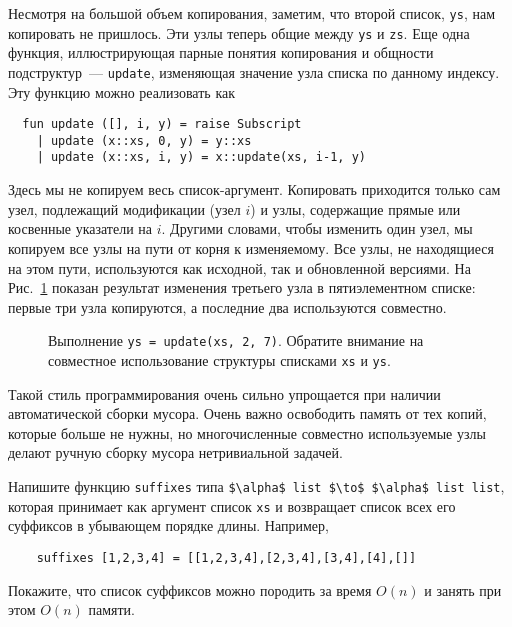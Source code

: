 Несмотря на большой объем копирования, заметим, что второй список, \lstinline!ys!, нам
копировать не пришлось. Эти узлы теперь общие между
\lstinline!ys! и \lstinline!zs!. Еще одна функция, иллюстрирующая
парные понятия копирования и общности подструктур~---
\lstinline!update!, изменяющая значение узла списка по данному
индексу. Эту функцию можно реализовать как
\begin{lstlisting}
  fun update ([], i, y) = raise Subscript
    | update (x::xs, 0, y) = y::xs
    | update (x::xs, i, y) = x::update(xs, i-1, y)
\end{lstlisting}
Здесь мы не копируем весь список-аргумент. Копировать приходится
только сам узел, подлежащий модификации (узел $i$) и узлы,
содержащие прямые или косвенные указатели на $i$.  Другими словами,
чтобы изменить один узел, мы копируем все узлы на пути от корня
к изменяемому. Все узлы, не находящиеся на этом пути, используются как
исходной, так и обновленной версиями. На Рис.~\ref{fig:2.6} показан
результат изменения третьего узла в пятиэлементном списке: первые
три узла копируются, а последние два используются совместно.

\begin{figure}
  \centering

  \caption{Выполнение \lstinline!ys = update(xs, 2, 7)!. Обратите
    внимание на совместное использование структуры списками \lstinline!xs! и \lstinline!ys!.}
  \label{fig:2.6}
\end{figure}

\begin{remark}
  Такой стиль программирования очень сильно упрощается при наличии
  автоматической сборки мусора. Очень важно освободить память от тех
  копий, которые больше не нужны, но многочисленные совместно используемые
  узлы делают ручную сборку мусора нетривиальной задачей.
\end{remark}

\begin{exercise}\label{ex:2.1}
  Напишите функцию \lstinline!suffixes! типа
  \lstinline!$\alpha$ list $\to$ $\alpha$ list list!, которая принимает как
  аргумент список \lstinline!xs! и возвращает список всех его
  суффиксов в убывающем порядке длины. Например,
  \begin{lstlisting}
    suffixes [1,2,3,4] = [[1,2,3,4],[2,3,4],[3,4],[4],[]]
  \end{lstlisting}
  Покажите, что список суффиксов можно породить за время $O(n)$ и
  занять при этом $O(n)$ памяти.
\end{exercise}

